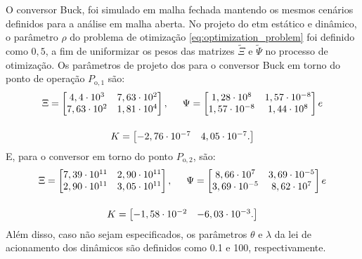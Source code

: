 O conversor Buck, foi simulado em malha fechada mantendo os mesmos cenários definidos para a análise em malha aberta. No projeto do \acrshort{etm} estático e dinâmico, o parâmetro $\rho$ do problema de otimização \eqref{eq:optimization_problem} foi definido como $0,5$, a fim de uniformizar os pesos das matrizes $\tilde{\Xi}$ e $\tilde{\Psi}$ no processo de otimização. Os parâmetros de projeto dos  para o conversor Buck em torno do ponto de operação $P_{\mathrm{o}, 1}$ são: \begin{gather}
  \Xi = \begin{bmatrix}
    4,4 \cdot 10^3  & 7,63 \cdot 10^2 \\
    7,63 \cdot 10^2 & 1,81 \cdot 10^4 \\
  \end{bmatrix}, \hspace{.5cm}
  \Psi = \begin{bmatrix}
    1,28 \cdot 10^8    & 1,57 \cdot 10^{-8} \\
    1,57 \cdot 10^{-8} & 1,44 \cdot 10^8    \\
  \end{bmatrix} e \notag \\[12pt]
  K = \begin{bmatrix}
    -2,76 \cdot 10^{-7} & 4,05 \cdot 10^{-7}. \notag
  \end{bmatrix}
\end{gather} E, para o conversor em torno do ponto $P_{\mathrm{o}, 2}$, são: \begin{gather}
  \Xi = \begin{bmatrix}
    7,39 \cdot 10^{11} & 2,90 \cdot 10^{11} \\
    2,90 \cdot 10^{11} & 3,05 \cdot 10^{11} \\
  \end{bmatrix}, \hspace{.5cm}
  \Psi = \begin{bmatrix}
    8,66 \cdot 10^7    & 3,69 \cdot 10^{-5} \\
    3,69 \cdot 10^{-5} & 8,62 \cdot 10^7    \\
  \end{bmatrix} e \notag \\[12pt]
  K = \begin{bmatrix}
    -1,58 \cdot 10^{-2} & -6,03 \cdot 10^{-3}. \notag
  \end{bmatrix}
\end{gather} Além disso, caso não sejam especificados, os parâmetros $\theta$ e $\lambda$ da lei de acionamento dos  dinâmicos são definidos como 0.1 e 100, respectivamente.

